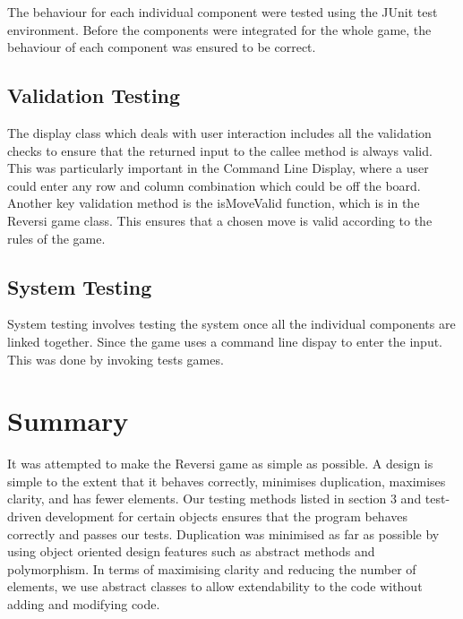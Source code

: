 \documentclass[english]{article}
\begin{document}
The behaviour for each individual component were tested using the
JUnit test environment. Before the components were integrated for
the whole game, the behaviour of each component was ensured to be
correct. 


\subsection{Validation Testing}

The display class which deals with user interaction includes all the
validation checks to ensure that the returned input to the callee
method is always valid. This was particularly important in the Command
Line Display, where a user could enter any row and column combination
which could be off the board. Another key validation method is the
isMoveValid function, which is in the Reversi game class. This ensures
that a chosen move is valid according to the rules of the game.


\subsection{System Testing}

System testing involves testing the system once all the individual
components are linked together. Since the game uses a command line
dispay to enter the input. This was done by invoking tests games.


\section{Summary}

It was attempted to make the Reversi game as simple as possible. A
design is simple to the extent that it behaves correctly, minimises
duplication, maximises clarity, and has fewer elements. Our testing
methods listed in section 3 and test-driven development for certain
objects ensures that the program behaves correctly and passes our
tests. Duplication was minimised as far as possible by using object
oriented design features such as abstract methods and polymorphism.
In terms of maximising clarity and reducing the number of elements,
we use abstract classes to allow extendability to the code without
adding and modifying code.
\end{document}
